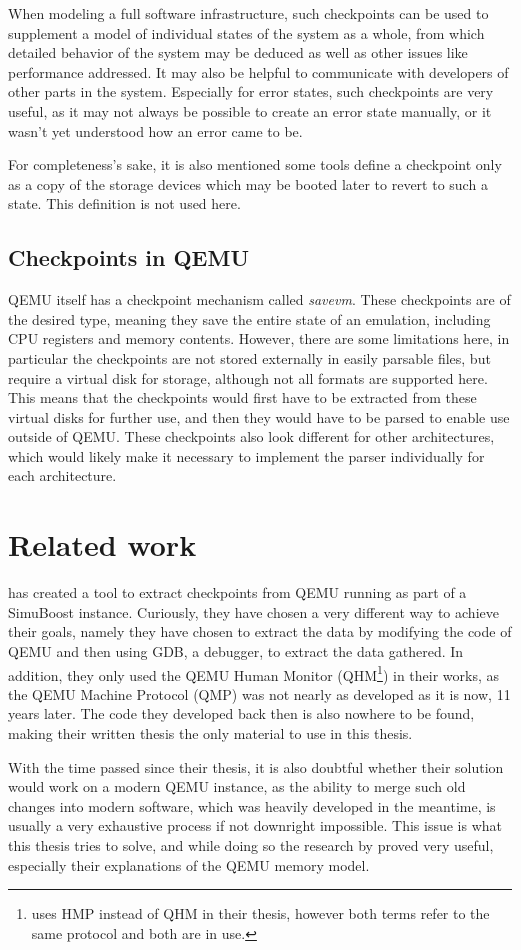 When modeling a full software infrastructure,
such checkpoints can be used to supplement a model of individual states of the system as a whole,
from which detailed behavior of the system may be deduced
as well as other issues like performance addressed.
It may also be helpful to communicate with developers of other parts in the system.
Especially for error states, such checkpoints are very useful,
as it may not always be possible to create an error state manually,
or it wasn't yet understood how an error came to be.

For completeness's sake, it is also mentioned some tools define a checkpoint only as a copy of the storage devices
which may be booted later to revert to such a state.
This definition is not used here.

\subsection{Checkpoints in QEMU}
QEMU itself has a checkpoint mechanism called \emph{savevm}.
These checkpoints are of the desired type, meaning they save the entire state of an emulation,
including CPU registers and memory contents.
However, there are some limitations here, in particular the checkpoints are not stored externally in easily parsable files,
but require a virtual disk for storage, although not all formats are supported here.
This means that the checkpoints would first have to be extracted from these virtual disks for further use,
and then they would have to be parsed to enable use outside of QEMU.
These checkpoints also look different for other architectures, which would likely make it necessary
to implement the parser individually for each architecture.

\section{Related work}
 has created a tool to extract checkpoints from QEMU running as part of a SimuBoost instance.
Curiously, they have chosen a very different way to achieve their goals,
namely they have chosen to extract the data by modifying the code of QEMU and then using GDB,
a debugger, to extract the data gathered.
In addition, they only used the QEMU Human Monitor (QHM\footnote{ uses HMP instead of QHM in their thesis, however both terms refer to the same protocol and both are in use.})
in their works, as the QEMU Machine Protocol (QMP) was not nearly as developed as it is now, 11 years later.
The code they developed back then is also nowhere to be found,
making their written thesis the only material to use in this thesis\cite{kitcheckpoints}.

With the time passed since their thesis,
it is also doubtful whether their solution would work on a modern QEMU instance,
as the ability to merge such old changes into modern software,
which was heavily developed in the meantime,
is usually a very exhaustive process if not downright impossible.
This issue is what this thesis tries to solve,
and while doing so the research by \citeauthor{kitcheckpoints} proved very useful,
especially their explanations of the QEMU memory model\cite{kitcheckpoints}.
